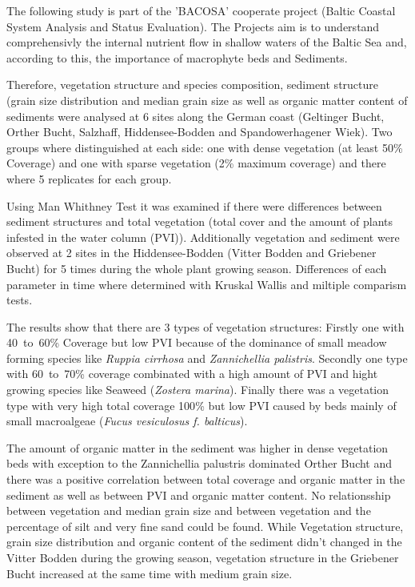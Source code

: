  The following study is part of the 'BACOSA' cooperate project (Baltic Coastal System Analysis and Status Evaluation). The Projects aim is to understand comprehensivly the internal nutrient flow in shallow waters of the Baltic Sea and, according to this, the importance of macrophyte beds and Sediments. 
 
 Therefore, vegetation structure and species composition, sediment structure (grain size distribution and median grain size as well as organic matter content of sediments were analysed at 6 sites along the German coast (Geltinger Bucht, Orther Bucht, Salzhaff, Hiddensee-Bodden and Spandowerhagener Wiek). Two groups where distinguished at each side: one with dense vegetation (at least \unit{50}{\%} Coverage) and one with sparse vegetation (\unit{2}{\%} maximum coverage) and there where 5 replicates for each group. 
 
Using Man Whithney Test it was examined if there were differences between sediment structures and total vegetation (total cover and the amount of plants infested in the water column (PVI)). Additionally vegetation and sediment were observed at 2 sites in the Hiddensee-Bodden (Vitter Bodden and Griebener Bucht) for 5 times during the whole plant growing season. Differences of each parameter in time where determined with Kruskal Wallis and miltiple comparism tests. 

The results show that there are 3 types of vegetation structures: Firstly one with \unit{40 to 60}{\%} Coverage but low PVI because of the dominance of small meadow forming species like \textit{Ruppia cirrhosa} and \textit{Zannichellia palistris}. Secondly one type with \unit{60 to 70}{\%} coverage combinated with a high amount of PVI and hight growing species like Seaweed (\textit{Zostera marina}). Finally there was a vegetation type with very high total coverage \unit{100}{\%} but low PVI caused by beds mainly of small macroalgeae (\textit{Fucus vesiculosus f. balticus}). 

The amount of organic matter in the sediment was higher in dense vegetation beds with exception to the Zannichellia palustris dominated Orther Bucht and there was a positive correlation between total coverage and organic matter in the sediment as well as between PVI and organic matter content. 
No relationsship between vegetation and median grain size and between vegetation and the percentage of silt and very fine sand could be found. While Vegetation structure, grain size distribution and organic content of the sediment didn't changed in the Vitter Bodden during the growing season, vegetation structure in the Griebener Bucht increased at the same time with medium grain size.








